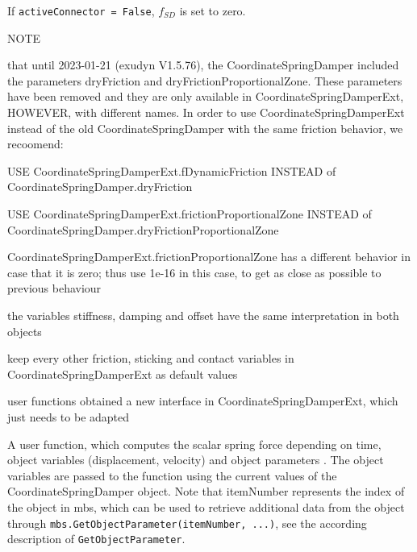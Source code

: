     If \texttt{activeConnector = False}, $f_{SD}$ is set to zero.

    NOTE {\small that until 2023-01-21 (exudyn V1.5.76), the CoordinateSpringDamper included the parameters dryFriction and dryFrictionProportionalZone.
    These parameters have been removed and they are only available in CoordinateSpringDamperExt, HOWEVER, with different names.
    In order to use CoordinateSpringDamperExt instead of the old CoordinateSpringDamper with the same friction behavior, we recoomend:
    \bi
      \item USE CoordinateSpringDamperExt.fDynamicFriction INSTEAD of CoordinateSpringDamper.dryFriction
      \item USE CoordinateSpringDamperExt.frictionProportionalZone INSTEAD of CoordinateSpringDamper.dryFrictionProportionalZone
      \item CoordinateSpringDamperExt.frictionProportionalZone has a different behavior in case that it is zero; 
            thus use 1e-16 in this case, to get as close as possible to previous behaviour
      \item the variables stiffness, damping and offset have the same interpretation in both objects
      \item keep every other friction, sticking and contact variables in CoordinateSpringDamperExt as default values
      \item user functions obtained a new interface in CoordinateSpringDamperExt, which just needs to be adapted
    \ei}
    A user function, which computes the scalar spring force depending on time, object variables (displacement, velocity) 
    and object parameters .
    The object variables are passed to the function using the current values of the CoordinateSpringDamper object.
    Note that itemNumber represents the index of the object in mbs, which can be used to retrieve additional data from the object through
    \texttt{mbs.GetObjectParameter(itemNumber, ...)}, see the according description of \texttt{GetObjectParameter}.
